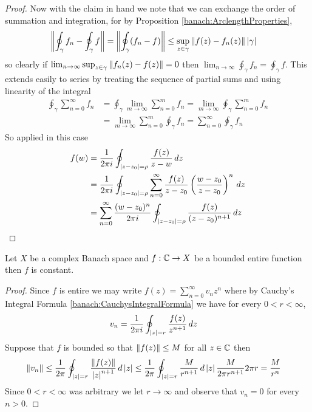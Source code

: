 \begin{proof}
  Now with the claim in hand we note that we can exchange the order of summation and integration,
  for by Proposition \ref{banach:ArclengthProperties},
  \begin{align*}
    \left \lVert \oint_\gamma f_n - \oint_\gamma f \right \rVert &= \left \lVert \oint_\gamma (f_n -f)  \right \rVert \leq \sup_{z \in \gamma} \left \lVert f(z) - f_n(z) \right \rVert \left \vert \gamma \right \vert
  \end{align*}
  so clearly if $\lim_{n \to \infty} \sup_{z \in \gamma} \left \lVert f_n(z) - f(z) \right \rVert = 0$ then $\lim_{n \to \infty} \oint_\gamma f_n = \oint_\gamma f$.   This extends easily to series by treating the sequence of partial sums and using linearity of the integral
  \begin{align*}
    \oint_\gamma \sum_{n=0}^\infty f_n &= \oint_\gamma \lim_{m \to \infty} \sum_{n=0}^m f_n = \lim_{m \to \infty} \oint_\gamma \sum_{n=0}^m f_n \\
    &=\lim_{m \to \infty} \sum_{n=0}^m \oint_\gamma f_n = \sum_{n=0}^\infty \oint_\gamma f_n 
  \end{align*}
So applied in this case
  \begin{align*}
    f(w) &= \frac{1}{2\pi i} \oint_{\left \vert z - z_0 \right \vert = \rho} \frac{f(z)}{z - w} \, dz \\
    &=\frac{1}{2\pi i}  \oint_{\left \vert z - z_0 \right \vert = \rho} \sum_{n=0}^\infty \frac{f(z)}{z - z_0}\left(\frac{w - z_0}{z - z_0}\right)^n \, dz \\
    &= \sum_{n=0}^\infty \frac{(w - z_0)^n}{2\pi i} \oint_{\left \vert z - z_0 \right \vert = \rho} \frac{f(z)}{(z - z_0)^{n+1}} \, dz \\
  \end{align*}
\end{proof}

\begin{thm}\label{banach:LiouvillesTheorem}Let $X$ be a complex Banach space and $f : \mathbb{C} \to X$ be a bounded entire function then $f$ is constant.
\end{thm}
\begin{proof}
Since $f$ is entire we may write $f(z) = \sum_{n=0}^\infty v_n z^n$ where by Cauchy's Integral Formula \ref{banach:CauchysIntegralFormula} we have for every $0 < r < \infty$,
\begin{align*}
v_n &= \frac{1}{2\pi i} \oint_{\left \vert z \right \vert = r} \frac{f(z)}{z^{n+1}} \, dz
\end{align*}
Suppose that $f$ is bounded so that $\left \lVert f(z) \right \rVert \leq M$ for all $z \in \mathbb{C}$ then
\begin{align*}
\left \lVert v_n \right \rVert &\leq \frac{1}{2\pi} \oint_{\left \vert z \right \vert = r} \frac{\left \lVert f(z) \right \rVert}{\left \vert z \right \vert^{n+1}} \, d\left \vert z \right \vert \leq \frac{1}{2\pi} \oint_{\left \vert z \right \vert = r} \frac{M}{r^{n+1}} \, d\left \vert z \right \vert \frac{M}{2\pi r^{n+1}}  2 \pi r = \frac{M}{r^n}
\end{align*}
Since $0 < r < \infty$ was arbitrary we let $r \to \infty$ and observe that $v_n = 0$ for every $n > 0$.
\end{proof}

